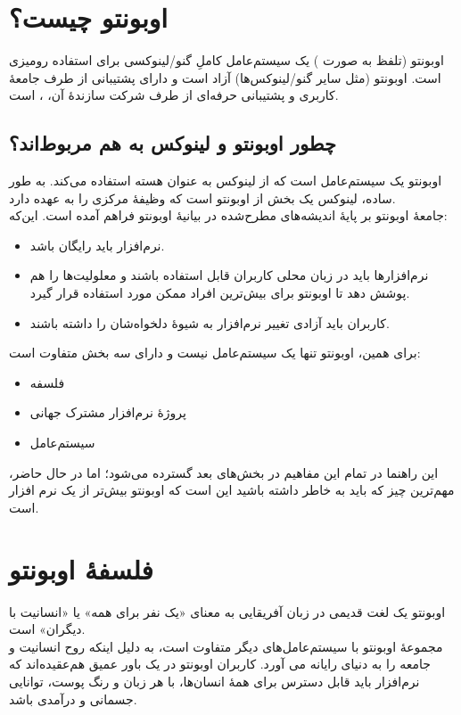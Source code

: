 \section{اوبونتو چیست؟}
اوبونتو (تلفظ به صورت ) یک سیستم‌عامل کاملِ گنو/لینوکسی برای استفاده رومیزی است. اوبونتو (مثل سایر گنو/لینوکس‌ها) آزاد است و دارای پشتیبانی از طرف جامعهٔ کاربری و پشتیبانی حرفه‌ای از طرف شرکت سازندهٔ آن، ، است.\\
\subsection{چطور اوبونتو  و لینوکس به هم مربوط‌اند؟}
اوبونتو یک سیستم‌عامل است که از لینوکس به عنوان هسته استفاده می‌کند. به طور ساده، لینوکس یک بخش از اوبونتو  است که وظیفهٔ مرکزی را به عهده دارد.\\

جامعهٔ اوبونتو بر پایهٔ اندیشه‌های مطرح‌شده در بیانیهٔ اوبونتو فراهم آمده است. این‌که:

\begin{itemize}
\item نرم‌افزار باید رایگان باشد.
\item نرم‌افزارها باید در زبان محلی کاربران قابل استفاده باشند و معلولیت‌ها را هم پوشش دهد تا اوبونتو برای بیش‌ترین افراد ممکن مورد استفاده قرار گیرد.
\item کاربران باید آزادی تغییر نرم‌افزار به شیوهٔ دلخواه‌شان را داشته باشند.\\
\end{itemize}

برای همین، اوبونتو تنها یک سیستم‌عامل نیست و دارای سه بخش متفاوت است:

\begin{itemize}
\item فلسفه
\item پروژهٔ نرم‌افزار مشترک جهانی
\item سیستم‌عامل
\end{itemize}

این راهنما در تمام این مفاهیم در بخش‌های بعد گسترده می‌شود؛ اما در حال حاضر، مهم‌ترین چیز که باید به خاطر داشته باشید این است که اوبونتو بیش‌تر از یک نرم افزار است.

\section{فلسفهٔ اوبونتو}
اوبونتو یک لغت قدیمی در زبان آفریقایی به معنای «یک نفر برای همه» یا «انسانیت با دیگران» است.\\
مجموعهٔ اوبونتو با سیستم‌عامل‌های دیگر متفاوت است، به دلیل اینکه روح انسانیت و جامعه را به دنیای رایانه می آورد. کاربران اوبونتو در یک باور عمیق هم‌عقیده‌اند که نرم‌افزار باید قابل دسترس برای همهٔ انسان‌ها، با هر زبان و رنگ پوست، توانایی جسمانی و درآمدی باشد.

